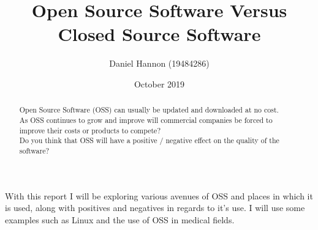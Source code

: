 \documentclass[12pt]{article}
\title{Open Source Software Versus Closed Source Software}
\author{Daniel Hannon (19484286)}
\date{October 2019}
\begin{document}
	\maketitle %
	\begin{abstract} %
		Open Source Software (OSS) can usually be updated and downloaded at no cost.
		\\As OSS continues to grow and improve will commercial companies be forced to improve their costs or products to compete?
		\\Do you think that OSS will have a positive / negative effect on the quality of the software?
	\end{abstract}
	With this report I will be exploring various avenues of OSS and places in which it is used, 
	along with positives and negatives in regards to it's use. I will use some examples such as Linux and the use of OSS
	in medical fields.\citep[]{verborgh2016triple}
\end{document}
